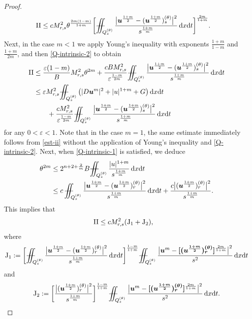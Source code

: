 \documentclass[a4paper, 10pt, american]{amsart}
\numberwithin{theorem}{section}
\numberwithin{equation}{section}
\newcommand{\dxdt}{\,\mathrm{d}x\mathrm{d}t}
\renewcommand{\epsilon}{\varepsilon}
\renewcommand{\epsilon}{\varepsilon}
\newcommand{\eps}{\varepsilon}
\newcommand{\power}[2]{\bm{#1^{\mbox{\unboldmath{\scriptsize$#2$}}}}}
\def\Xiint#1{\mathchoice
    {\XXiint\displaystyle\textstyle{#1}}%
    {\XXiint\textstyle\scriptstyle{#1}}%
    {\XXiint\scriptstyle\scriptscriptstyle{#1}}%
    {\XXiint\scriptscriptstyle\scriptscriptstyle{#1}}%
    \!\iint}
\def\XXiint#1#2#3{\setbox0=\hbox{$#1{#2#3}{\iint}$}
    \vcenter{\hbox{$#2#3$}}\kern-0.5\wd0}
\def\biint{\Xiint{-\!-}}
\begin{document}
\begin{proof}
\begin{align}\label{est-ii}
{\rm{II}}
&\le
cM_{r,s}^2\theta^{\frac{2m(1-m)}{1+m}}\bigg[\biint_{Q_s^{(\theta)}}\frac{\big|\power u{\frac{1+m}2}-( \power u{\frac{1+m}2})_s^{(\theta)} \big|^2}{s^\frac{1+m}m}\dxdt\bigg]^\frac{2m}{1+m}.
\end{align}
Next, in the case $m<1$ we apply Young's inequality with
exponents $\frac{1+m}{1-m}$ and $\frac{1+m}{2m}$, and then \eqref{Q-intrinsic-2} to obtain
\begin{align}\label{est-ii-1}
  {\rm{II}}
  & 
    \le \frac{\eps(1-m)}{B}M_{r,s}^2\theta^{2m}
  +
  \frac{cBM_{r,s}^2}{\epsilon^\frac{1-m}{2m}}\biint_{Q_s^{(\theta)}}\frac{\big|\power
    u{\frac{1+m}2}-( \power u{\frac{1+m}2})_s^{(\theta)}
    \big|^2}{s^\frac{1+m}m}\dxdt
\\
&\le
\epsilon M_{r,s}^2\biint_{Q_s^{(\theta)}}\big(|D\power um|^2+|u|^{1+m}+G\big)\dxdt\nonumber\\
&\qquad+
\frac{cM_{r,s}^2}{\epsilon^\frac{1-m}{2m}}\biint_{Q_s^{(\theta)}}\frac{\big|\power u{\frac{1+m}2}-( \power u{\frac{1+m}2})_s^{(\theta)} \big|^2}{s^\frac{1+m}m}\dxdt
\end{align}
for any $0<\epsilon<1$.
Note that in the case $m=1$, the same estimate immediately follows from
\eqref{est-ii} without the
application of Young's inequality and \eqref{Q-intrinsic-2}. 
Next, when \eqref{Q-intrinsic-1} is satisfied, we deduce
\begin{align*}
\theta^{2m}
&\le
2^{n+2+\frac2m}B\biint_{Q_s^{(\theta)}} \frac{|u|^{1+m}}{s^\frac{1+m}m}\dxdt\\
&\le
c\,\biint_{Q_s^{(\theta)}}\frac{\big|\power u{\frac{1+m}2}-( \power u{\frac{1+m}2})_r^{(\theta)} \big|^2}{s^\frac{1+m}m}\dxdt
+
\frac{c\big|( \power u{\frac{1+m}2})_r^{(\theta)}\big|^2}{s^\frac{1+m}m}.
\end{align*}
This implies that
\begin{align}
{\rm{II}}
&\le
cM_{r,s}^2 (\rm{J_1+J_2}),
\end{align}
where
$$
{\rm{J_1}}
:=
\bigg[ \biint_{Q_s^{(\theta)}}\frac{\big|\power u{\frac{1+m}2}-( \power u{\frac{1+m}2})_r^{(\theta)} \big|^2}{s^\frac{1+m}m}\dxdt \bigg]^{\frac{1-m}{1+m}}
\biint_{Q_s^{(\theta)}}\frac{\big|\power um-
\power{[(  u^{\frac{1+m}2})_r^{(\theta)}]}{\frac{2m}{1+m}} \big|^2}{s^2}\dxdt
$$
and
$$
{\rm{J_2}}
:=
\bigg[ \frac{\big|( \power u{\frac{1+m}2})_r^{(\theta)}\big|^2}{s^\frac{1+m}m}\bigg]^{\frac{1-m}{1+m}}
\biint_{Q_s^{(\theta)}}\frac{\big|\power um-
\power{[(u^{\frac{1+m}2})_r^{(\theta)}]}{\frac{2m}{1+m}} \big|^2}{s^2}\dxdt.
$$
\end{proof}
\end{document}
